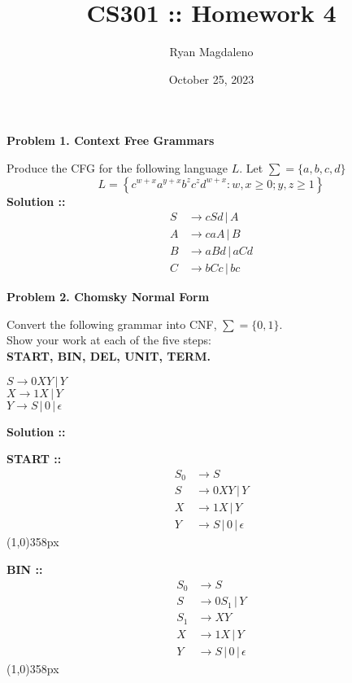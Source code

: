 \documentclass[11pt]{article}
\date{October 25, 2023}
\title{CS301 :: Homework 4}
\author{Ryan Magdaleno}
\begin{document}
\maketitle


\textbf{Problem 1. Context Free Grammars}

Produce the CFG for the following language $L$. Let $\sum=\{a,b,c,d\}$
$$L = \left\{c^{w+x}a^{y+x}b^zc^zd^{w+x} : w, x\ge0;y,z\ge1\right\}$$
\vspace{5px}\textbf{Solution ::}
\begin{align}
    S&\longrightarrow cSd \,|\, A \\
    A&\longrightarrow caA \,|\, B \\
    B&\longrightarrow aBd \,|\, aCd \\
    C&\longrightarrow bCc \,|\, bc
\end{align}
\pagebreak


\textbf{Problem 2. Chomsky Normal Form} 

Convert the following grammar into CNF, $\sum = \{0,1\}.$ \\
Show your work at each of the five steps: \\
\textbf{START, BIN, DEL, UNIT, TERM.}

$S\longrightarrow 0XY \,|\, Y$ \\
$X\longrightarrow 1X \,|\, Y$ \\
$Y\longrightarrow S \,|\, 0 \,|\, \epsilon$

\vspace{5px}\textbf{Solution ::}

\textbf{START ::}
\begin{align}
    S_0&\longrightarrow S \\
    S&\longrightarrow 0XY \,|\, Y \\
    X&\longrightarrow 1X \,|\, Y \\
    Y&\longrightarrow S \,|\, 0 \,|\, \epsilon
\end{align}
\line(1,0){358px}

\textbf{BIN ::}
\begin{align}
    S_0&\longrightarrow S\\
    S&\longrightarrow 0S_1 \,|\, Y \\
    S_1&\longrightarrow XY\\
    X&\longrightarrow 1X \,|\, Y \\
    Y&\longrightarrow S \,|\, 0 \,|\, \epsilon
\end{align}
\line(1,0){358px}
\end{document}
